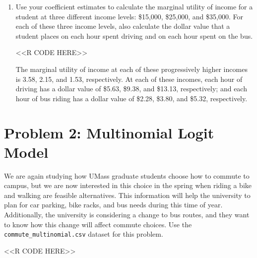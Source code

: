 \documentclass[11pt,letterpaper]{article}
\begin{document}
\begin{enumerate}[label=\alph*., leftmargin=*]
\begin{enumerate}[label=\roman*.]
		\item Use your coefficient estimates to calculate the marginal utility of income for a student at three different income levels: \$15,000, \$25,000, and \$35,000. For each of these three income levels, also calculate the dollar value that a student places on each hour spent driving and on each hour spent on the bus.

		<<R CODE HERE>>

		The marginal utility of income at each of these progressively higher incomes is 3.58, 2.15, and 1.53, respectively. At each of these incomes, each hour of driving has a dollar value of \$5.63, \$9.38, and \$13.13, respectively; and each hour of bus riding has a dollar value of \$2.28, \$3.80, and \$5.32, respectively.
	\end{enumerate}
\end{enumerate}

\section*{Problem 2: Multinomial Logit Model}

We are again studying how UMass graduate students choose how to commute to campus, but we are now interested in this choice in the spring when riding a bike and walking are feasible alternatives. This information will help the university to plan for car parking, bike racks, and bus needs during this time of year. Additionally, the university is considering a change to bus routes, and they want to know how this change will affect commute choices. Use the \texttt{commute\_multinomial.csv} dataset for this problem.

<<R CODE HERE>>
\end{document}
